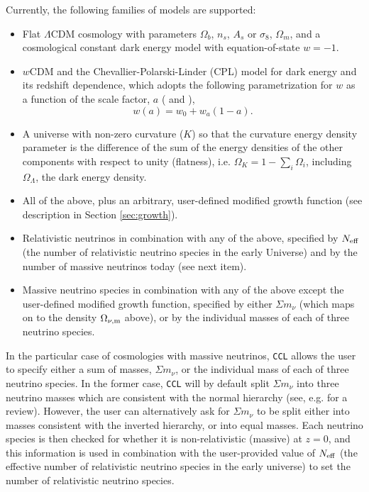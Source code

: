 \documentclass[\docopts]{\docclass}
\newcommand{\ccl}{{\tt CCL}\xspace}
\begin{document}
Currently, the following families of models are supported:
\begin{itemize}
 \item Flat $\Lambda$CDM cosmology with parameters $\Omega_b$, $n_s$, $A_s$ or $\sigma_8$, $\Omega_m$, and a cosmological constant dark energy model with equation-of-state $w=-1$. 
\item $w$CDM and the Chevallier-Polarski-Linder (CPL) model for dark energy and its redshift dependence, which adopts the following parametrization for $w$ as a function of the scale factor, $a$ (\citealt{Chevallier01} and \citealt{Linder03}),
  \begin{equation}
    w(a) = w_0+w_a(1-a).
  \end{equation}
 \item A universe with non-zero curvature ($K$) so that the curvature energy density parameter is the difference of the sum of the energy densities of the other components with respect to unity (flatness), i.e. $\Omega_K = 1- \sum_i \Omega_i$, including $\Omega_\Lambda$, the dark energy density.
 \item All of the above, plus an arbitrary, user-defined modified growth function (see description in Section \ref{sec:growth}).
 \item Relativistic neutrinos in combination with any of the above, specified by $N_{\rm eff}$ (the number of relativistic neutrino species in the early Universe) and by the number of massive neutrinos today (see next item).
  \item Massive neutrino species in combination with any of the above except the user-defined modified growth function, specified by either $\Sigma m_\nu$ (which maps on to the density $\Omega_{\nu, {\rm m}}$ above), or by the individual masses of each of three neutrino species.
\end{itemize}

In the particular case of cosmologies with massive neutrinos, \ccl allows the user to specify either a sum of masses, $\Sigma m_\nu$, or the individual mass of each of three neutrino species. In the former case, \ccl will by default split $\Sigma m_\nu$ into three neutrino masses which are consistent with the normal hierarchy (see, e.g. \cite{Gerbino2017} for a review). However, the user can alternatively ask for $\Sigma m_\nu$ to be split either into masses consistent with the inverted hierarchy, or into equal masses. Each neutrino species is then checked for whether it is non-relativistic (massive) at $z=0$, and this information is used in combination with the user-provided value of $N_{\rm eff}$ (the effective number of relativistic neutrino species in the early universe) to set the number of relativistic neutrino species.
\end{document}
